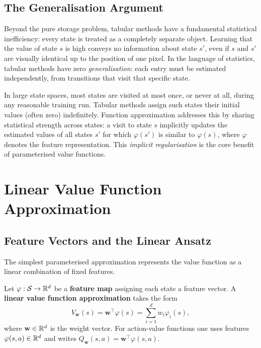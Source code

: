 \subsection{The Generalisation Argument}

Beyond the pure storage problem, tabular methods have a fundamental statistical inefficiency: every
state is treated as a completely separate object.  Learning that the value of state $s$ is high
conveys no information about state $s'$, even if $s$ and $s'$ are visually identical up to the
position of one pixel.  In the language of statistics, tabular methods have zero
\emph{generalisation}: each entry must be estimated independently, from transitions that visit
that specific state.

In large state spaces, most states are visited at most once, or never at all, during any reasonable
training run.  Tabular methods assign such states their initial values (often zero) indefinitely.
Function approximation addresses this by sharing statistical strength across states: a visit to
state $s$ implicitly updates the estimated values of all states $s'$ for which $\varphi(s')$ is
similar to $\varphi(s)$, where $\varphi$ denotes the feature representation.  This
\emph{implicit regularisation} is the core benefit of parameterised value functions.

\section{Linear Value Function Approximation}
\label{sec:linear-vfa}

\subsection{Feature Vectors and the Linear Ansatz}

The simplest parameterised approximation represents the value function as a linear combination of
fixed features.

\begin{definition}
\label{def:linear-vfa}
Let $\varphi : \mathcal{S} \to \mathbb{R}^d$ be a \textbf{feature map} assigning each state a
feature vector.  A \textbf{linear value function approximation} takes the form
\begin{equation}
\label{eq:linear-vfa}
V_\mathbf{w}(s) = \mathbf{w}^\top \varphi(s) = \sum_{i=1}^d w_i \varphi_i(s),
\end{equation}
where $\mathbf{w} \in \mathbb{R}^d$ is the weight vector.  For action-value functions one uses features
$\varphi(s, a) \in \mathbb{R}^d$ and writes $Q_\mathbf{w}(s, a) = \mathbf{w}^\top \varphi(s, a)$.
\end{definition}

